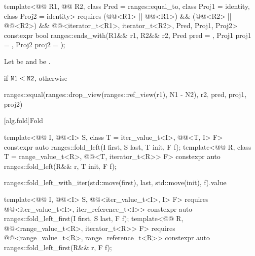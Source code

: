 \begin{itemdecl}
template<@@ R1, @@ R2, class Pred = ranges::equal_to, class Proj1 = identity,
         class Proj2 = identity>
  requires (@@<R1> || @@<R1>) &&
           (@@<R2> || @@<R2>) &&
           @@<iterator_t<R1>, iterator_t<R2>, Pred, Proj1, Proj2>
  constexpr bool ranges::ends_with(R1&& r1, R2&& r2, Pred pred = {},
                                   Proj1 proj1 = {}, Proj2 proj2 = {});
\end{itemdecl}

\begin{itemdescr}
\pnum
Let  be  and
 be .

\pnum
\returns
{} if $\texttt{\protect N1} < \texttt{\protect N2}$, otherwise
\begin{codeblock}
ranges::equal(ranges::drop_view(ranges::ref_view(r1), N1 - N2), r2, pred, proj1, proj2)
\end{codeblock}
\end{itemdescr}

[alg.fold]{Fold}

%
\begin{itemdecl}
template<@@ I, @@<I> S, class T = iter_value_t<I>,
         @@<T, I> F>
  constexpr auto ranges::fold_left(I first, S last, T init, F f);
template<@@ R, class T = range_value_t<R>,
         @@<T, iterator_t<R>> F>
  constexpr auto ranges::fold_left(R&& r, T init, F f);
\end{itemdecl}

\begin{itemdescr}
\pnum
\returns
\begin{codeblock}
ranges::fold_left_with_iter(std::move(first), last, std::move(init), f).value
\end{codeblock}
\end{itemdescr}

%
\begin{itemdecl}
template<@@ I, @@<I> S,
         @@<iter_value_t<I>, I> F>
  requires @@<iter_value_t<I>, iter_reference_t<I>>
  constexpr auto ranges::fold_left_first(I first, S last, F f);
template<@@ R, @@<range_value_t<R>, iterator_t<R>> F>
  requires @@<range_value_t<R>, range_reference_t<R>>
  constexpr auto ranges::fold_left_first(R&& r, F f);
\end{itemdecl}

